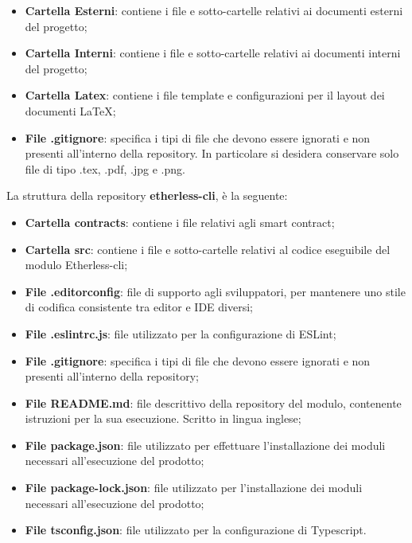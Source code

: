 			\begin{itemize}
				\item \textbf{Cartella Esterni}: contiene i file e sotto-cartelle relativi ai documenti esterni del progetto;
				\item \textbf{Cartella Interni}: contiene i file e sotto-cartelle relativi ai documenti interni del progetto;
				\item \textbf{Cartella Latex}: contiene i file template e configurazioni per il layout dei documenti \LaTeX{};
				\item \textbf{File .gitignore}: specifica i tipi di file che devono essere ignorati e non presenti all'interno della repository. In particolare si desidera conservare solo file di tipo .tex, .pdf, .jpg e .png.
			\end{itemize}
			La struttura della repository \textbf{etherless-cli}, è la seguente:
			\begin{itemize}
				\item \textbf{Cartella contracts}: contiene i file relativi agli smart contract;
				\item \textbf{Cartella src}: contiene i file e sotto-cartelle relativi al codice eseguibile del modulo Etherless-cli;
				\item \textbf{File .editorconfig}: file di supporto agli sviluppatori, per mantenere uno stile di codifica consistente tra editor e IDE diversi;
				\item \textbf{File .eslintrc.js}: file utilizzato per la configurazione di ESLint;
				\item \textbf{File .gitignore}: specifica i tipi di file che devono essere ignorati e non presenti all'interno della repository;
				\item \textbf{File README.md}: file descrittivo della repository del modulo, contenente istruzioni per la sua esecuzione. Scritto in lingua inglese;
				\item \textbf{File package.json}: file utilizzato per effettuare l'installazione dei moduli necessari all'esecuzione del prodotto;
				\item \textbf{File package-lock.json}: file utilizzato per l'installazione dei moduli necessari all'esecuzione del prodotto;
				\item \textbf{File tsconfig.json}: file utilizzato per la configurazione di Typescript.
			\end{itemize}
